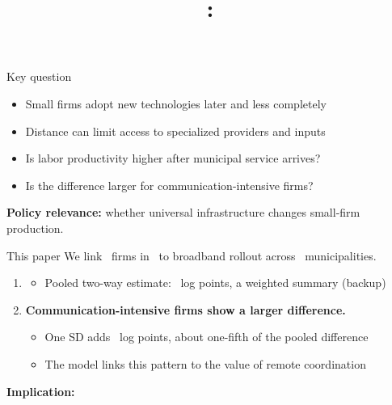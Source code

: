 \documentclass[11pt,aspectratio=169]{beamer}
\title[\PaperShortTitle]{\PaperTitle:\texorpdfstring{\\[0.25em]}{ }\PaperSubtitle}
\author[\AuthorShort]{\PaperAuthors}
\institute{}
\date{\VenueDate}
\begin{document}
\begin{frame}[plain]
  \titlepage
  \vfill
  \centering\scriptsize\textit{\TitleDisclaimer}
\end{frame}
\addtocounter{framenumber}{-1}

\begin{frame}{Key question}
  \hypertarget{main:question}{}%
  \medskip

  \bigskip
  \begin{itemize}\setlength{\itemsep}{0.56em}
    \item Small firms adopt new technologies later and less completely
    \item Distance can limit access to specialized providers and inputs
  \end{itemize}

  \bigskip
  \begin{itemize}\setlength{\itemsep}{0.56em}
    \item Is labor productivity higher after \textcolor{cBroadband}{municipal service} arrives?
    \item Is the difference larger for \textcolor{cTasks}{communication-intensive firms}?
  \end{itemize}

  \bigskip
  \textbf{Policy relevance:} whether universal infrastructure changes small-firm production.
\end{frame}

\begin{frame}{This paper}
  \hypertarget{main:punchline}{}%
  \medskip
  We link \ResFirms\ firms in \ResYears\ to broadband rollout across
  \ResMunicipalities\ municipalities.
  \bigskip
  \begin{enumerate}\setlength{\itemsep}{1.0em}
    \item \KeyIdea{\ResultHeadlineSlide}
      \vspace{0.16em}
      \begin{itemize}\setlength{\itemsep}{0.42em}
        \item Pooled two-way estimate: \ResBaseline\ log points, a weighted summary (backup)
      \end{itemize}
    \item \textbf{\textcolor{cTasks}{Communication-intensive firms} show a larger difference.}
      \vspace{0.16em}
      \begin{itemize}\setlength{\itemsep}{0.42em}
        \item One SD adds \ResCommSDGap\ log points, about one-fifth of the pooled difference
        \item The model links this pattern to the value of remote coordination
      \end{itemize}
  \end{enumerate}

  \bigskip
  \textbf{Implication:} \ResultImplicationSlide
\end{frame}
\end{document}
